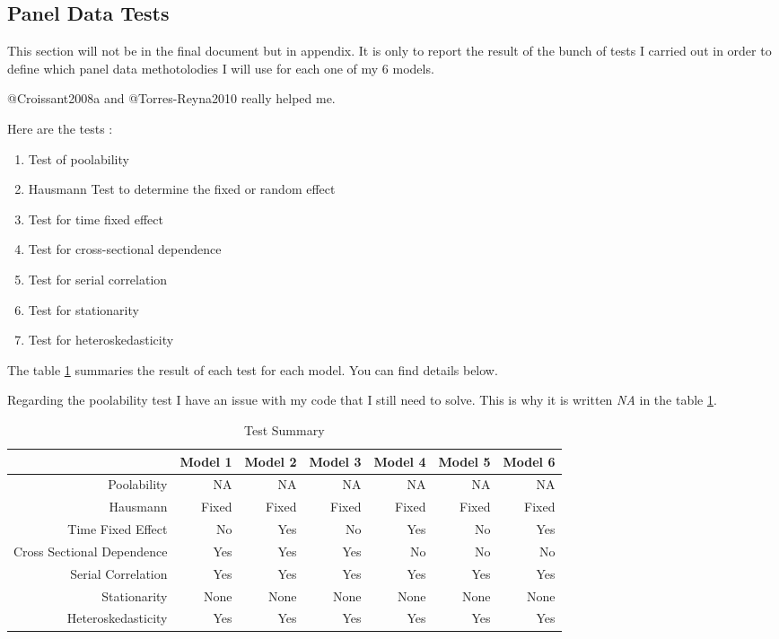 \documentclass[]{article}
\providecommand{\tightlist}{%
  \setlength{\itemsep}{0pt}\setlength{\parskip}{0pt}}
\begin{document}
\newpage

\subsection{Panel Data Tests}\label{panel-data-tests}

This section will not be in the final document but in appendix. It is
only to report the result of the bunch of tests I carried out in order
to define which panel data methotolodies I will use for each one of my 6
models.

@Croissant2008a and @Torres-Reyna2010 really helped me.

Here are the tests :

\begin{enumerate}
\def\labelenumi{\arabic{enumi}.}
\tightlist
\item
  Test of poolability
\item
  Hausmann Test to determine the fixed or random effect
\item
  Test for time fixed effect
\item
  Test for cross-sectional dependence
\item
  Test for serial correlation
\item
  Test for stationarity
\item
  Test for heteroskedasticity
\end{enumerate}

The table \ref{TestSummary} summaries the result of each test for each
model. You can find details below.

Regarding the poolability test I have an issue with my code that I still
need to solve. This is why it is written \emph{NA} in the table
\ref{TestSummary}.

\begin{table}[h]
\centering
\begin{tabular}{rrrrrrr}
\hline
 & {Model 1} & {Model 2} & {Model 3} & {Model 4} & {Model 5} & {Model 6} \\ 
\hline
{Poolability} & NA & NA & NA & NA & NA & NA \\
{Hausmann} & Fixed & Fixed & Fixed & Fixed & Fixed & Fixed \\
{Time Fixed Effect} & No & Yes & No & Yes & No & Yes \\
{Cross Sectional Dependence} & Yes & Yes & Yes & No & No & No \\
{Serial Correlation} & Yes & Yes & Yes & Yes & Yes & Yes \\
{Stationarity} & None & None & None & None & None & None \\
{Heteroskedasticity} & Yes & Yes & Yes & Yes & Yes & Yes \\ 
\hline
\end{tabular}
\caption{Test Summary}
\label{TestSummary}
\end{table}
\end{document}
